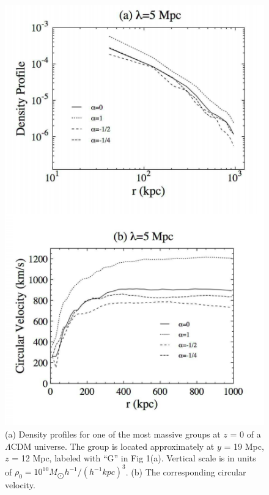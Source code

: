 \documentclass[10pt,journal]{IEEEtran}
\begin{document}
\begin{figure}[H]
    \centering
    \includegraphics[scale=0.55]{img/alma 2.png}
    \caption{ (a) Density profiles for one of the most massive groups
at $z$ = 0 of a $\Lambda$CDM universe. The group is located approximately at $y$ = 19 Mpc, $z$ = 12 Mpc, labeled with “G” in Fig
1(a). Vertical scale is in units of $\rho_0=10^{10}M_{\bigodot}h^{-1}/(h^{-1}kpc)^3$.
(b) The corresponding circular velocity.}
    \label{f:2}
\end{figure}
\end{document}
